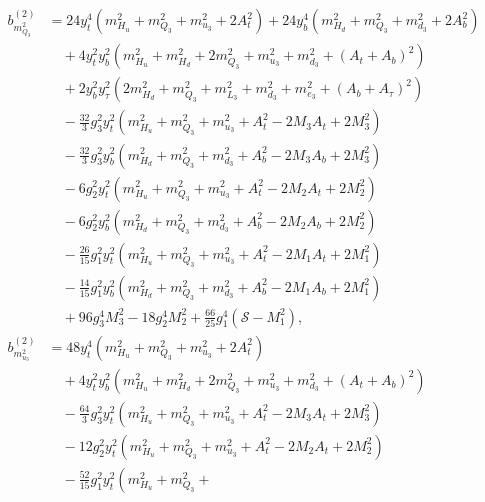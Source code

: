 \documentclass[preprint,amsmath,amssymb,aps,superscriptaddress,prd,
showpacs,floatfix,nofootinbib]{revtex4-1}
\begin{document}
\begin{subequations} \label{eq:MSSMsEffPotCoeffs}
\begin{align}
b_{m_{Q_3}^2}^{(2)} &= 24 y_t^4 \left ( m_{H_u}^2 + m_{Q_3}^2 + m_{u_3}^2 +
2 A_t^2 \right ) + 24 y_b^4 \left ( m_{H_d}^2 + m_{Q_3}^2 + m_{d_3}^2 +
2 A_b^2 \right ) \nonumber \\
& \quad {} + 4 y_t^2 y_b^2 \left ( m_{H_u}^2 + m_{H_d}^2 + 2 m_{Q_3}^2 +
m_{u_3}^2 + m_{d_3}^2 + ( A_t + A_b )^2 \right ) \nonumber \\
& \quad {} + 2 y_b^2 y_\tau^2 \left ( 2 m_{H_d}^2 + m_{Q_3}^2 + m_{L_3}^2 +
m_{d_3}^2 + m_{e_3}^2 + ( A_b + A_\tau )^2 \right ) \nonumber \\
& \quad {} - \frac{32}{3} g_3^2 y_t^2 \left ( m_{H_u}^2 + m_{Q_3}^2 +
m_{u_3}^2 + A_t^2 - 2 M_3 A_t + 2 M_3^2 \right ) \nonumber \\
& \quad {} - \frac{32}{3} g_3^2 y_b^2 \left ( m_{H_d}^2 + m_{Q_3}^2 +
m_{d_3}^2 + A_b^2 - 2 M_3 A_b + 2 M_3^2 \right ) \nonumber \\
& \quad {} - 6 g_2^2 y_t^2 \left ( m_{H_u}^2 + m_{Q_3}^2 + m_{u_3}^2 + A_t^2
- 2 M_2 A_t + 2 M_2^2 \right ) \nonumber \\
& \quad {} - 6 g_2^2 y_b^2 \left ( m_{H_d}^2 + m_{Q_3}^2 + m_{d_3}^2 + A_b^2
- 2 M_2 A_b + 2 M_2^2 \right ) \nonumber \\
& \quad {} - \frac{26}{15} g_1^2 y_t^2 \left ( m_{H_u}^2 + m_{Q_3}^2 +
m_{u_3}^2 + A_t^2 - 2 M_1 A_t + 2 M_1^2 \right ) \nonumber \\
& \quad {} - \frac{14}{15} g_1^2 y_b^2 \left ( m_{H_d}^2 + m_{Q_3}^2 +
m_{d_3}^2 + A_b^2 - 2 M_1 A_b + 2 M_1^2 \right ) \nonumber \\
& \quad {} + 96 g_3^4 M_3^2 - 18 g_2^4 M_2^2 + \frac{66}{25} g_1^4
( \mathcal{S} - M_1^2 ) , \label{eq:MSSMmQ32b2} \\
b_{m_{u_3}^2}^{(2)} &= 48 y_t^4 \left ( m_{H_u}^2 + m_{Q_3}^2 + m_{u_3}^2 +
2 A_t^2 \right ) \nonumber \\
& \quad {} + 4 y_t^2 y_b^2 \left ( m_{H_u}^2 + m_{H_d}^2 + 2 m_{Q_3}^2 +
m_{u_3}^2 + m_{d_3}^2 + ( A_t + A_b )^2 \right ) \nonumber \\
& \quad {} - \frac{64}{3} g_3^2 y_t^2 \left ( m_{H_u}^2 + m_{Q_3}^2 +
m_{u_3}^2 + A_t^2 - 2 M_3 A_t + 2 M_3^2 \right ) \nonumber \\
& \quad {} - 12 g_2^2 y_t^2 \left ( m_{H_u}^2 + m_{Q_3}^2 + m_{u_3}^2 +
A_t^2 - 2 M_2 A_t + 2 M_2^2 \right ) \nonumber \\
& \quad {} - \frac{52}{15} g_1^2 y_t^2 \left ( m_{H_u}^2 + m_{Q_3}^2 +

\end{align}
\end{subequations}
\end{document}
